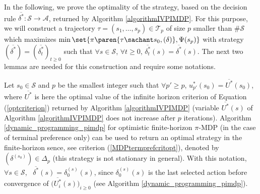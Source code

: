 In the following, we prove the optimality of the strategy,
based on the decision rule $\overline{\delta^*}: \mathcal{S} \rightarrow \mathcal{A}$, 
returned by Algorithm \ref{algorithmIVPIMDP}. 
For this purpose, we will construct a trajectory $\tau = (s_1, \ldots, s_p) \in \mathcal{T}_p$
of size $p$ smaller than $\# \mathcal{S}$ 
which maximizes $\min \set{ \pi \paren{\tau \sachant s_0, (\delta) }, \Psi(s_p) }$ 
with strategy $(\overline{\delta^*}) = (\overline{\delta^*_t})_{t\geqslant 0}$
such that $\forall s \in \mathcal{S}$,
$\forall t \geqslant 0$,
$\overline{\delta^*_t}(s) = \overline{\delta^*}(s)$. 
The next two lemmas are needed for this construction and require some notations. 

Let $s_0 \in \mathcal{S}$ 
and $p$ be the smallest integer 
such that $\forall p' \geqslant p$, 
$u^*_{p'}(s_0)=\overline{U^*}(s_0)$, 
where $\overline{U^*}$ is here the optimal value 
of the infinite horizon criterion of Equation 
(\ref{optcriterion}) returned by Algorithm \ref{algorithmIVPIMDP}
(variable $\overline{U^*}(s)$ of Algorithm \ref{algorithmIVPIMDP} 
does not increase after $p$ iterations). 
Algorithm \ref{dynamic_programming_pimdp}
for optimistic finite-horizon $\pi$-MDP
(in the case of terminal preference only)
can be used to return an optimal strategy 
in the finite-horizon sence, see criterion (\ref{MDPtermprefcritopt}), 
denoted by $(\delta^{(s_0)}) \in \Delta_p$
(this strategy is not stationary in general). 
With this notation, 
$\forall s \in \mathcal{S}$, \ $\overline{\delta^*}(s) = \delta_0^{(s)}(s)$,
since $\delta_0^{(s)}(s)$ 
is the last selected action before convergence
of $\Big(\overline{U^*_i}(s)\Big)_{i \geqslant 0}$
(see Algorithm \ref{dynamic_programming_pimdp}).
 
